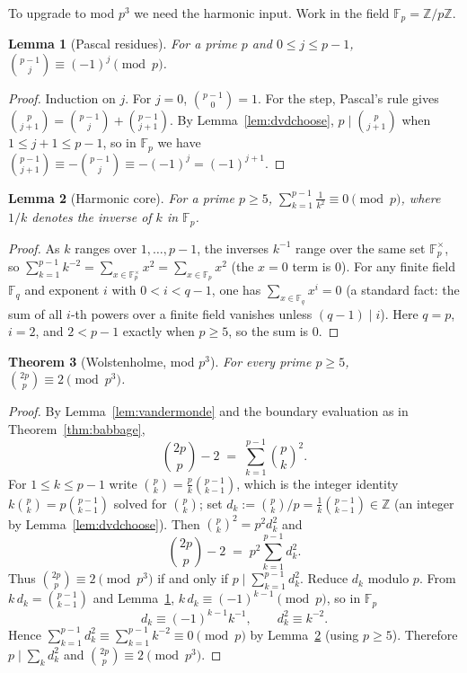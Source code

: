 \documentclass[11pt,a4paper]{article}
\newtheorem{theorem}{Theorem}[section]
\newtheorem{lemma}[theorem]{Lemma}
\theoremstyle{definition}
\theoremstyle{remark}
\begin{document}
To upgrade to mod $p^{3}$ we need the harmonic input.  Work in the field
$\mathbb F_p=\mathbb Z/p\mathbb Z$.

\begin{lemma}[Pascal residues]\label{lem:pascal}
For a prime $p$ and $0\le j\le p-1$, $\binom{p-1}{j}\equiv(-1)^{j}\pmod p$.
\end{lemma}

\begin{proof}
Induction on $j$.  For $j=0$, $\binom{p-1}{0}=1$.  For the step, Pascal's rule
gives $\binom{p}{j+1}=\binom{p-1}{j}+\binom{p-1}{j+1}$.  By
Lemma~\ref{lem:dvdchoose}, $p\mid\binom{p}{j+1}$ when $1\le j+1\le p-1$, so in
$\mathbb F_p$ we have $\binom{p-1}{j+1}\equiv-\binom{p-1}{j}\equiv
-(-1)^{j}=(-1)^{j+1}$.
\end{proof}

\begin{lemma}[Harmonic core]\label{lem:harmonic}
For a prime $p\ge 5$, $\displaystyle\sum_{k=1}^{p-1}\frac{1}{k^{2}}\equiv 0
\pmod p$, where $1/k$ denotes the inverse of $k$ in $\mathbb F_p$.
\end{lemma}

\begin{proof}
As $k$ ranges over $1,\dots,p-1$, the inverses $k^{-1}$ range over the same set
$\mathbb F_p^{\times}$, so $\sum_{k=1}^{p-1}k^{-2}=\sum_{x\in\mathbb
F_p^\times}x^{2}=\sum_{x\in\mathbb F_p}x^{2}$ (the $x=0$ term is $0$).  For any
finite field $\mathbb F_q$ and exponent $i$ with $0<i<q-1$, one has
$\sum_{x\in\mathbb F_q}x^{i}=0$ (a standard fact: the sum of all $i$-th powers
over a finite field vanishes unless $(q-1)\mid i$).  Here $q=p$, $i=2$, and
$2<p-1$ exactly when $p\ge5$, so the sum is $0$.
\end{proof}

\begin{theorem}[Wolstenholme, mod $p^3$]\label{thm:wolstenholme}
For every prime $p\ge 5$, $\binom{2p}{p}\equiv 2\pmod{p^{3}}$.
\end{theorem}

\begin{proof}
By Lemma~\ref{lem:vandermonde} and the boundary evaluation as in
Theorem~\ref{thm:babbage},
\[
  \binom{2p}{p}-2 \;=\; \sum_{k=1}^{p-1}\binom{p}{k}^{2}.
\]
For $1\le k\le p-1$ write $\binom{p}{k}=\tfrac{p}{k}\binom{p-1}{k-1}$, which is
the integer identity $k\binom{p}{k}=p\binom{p-1}{k-1}$ solved for
$\binom{p}{k}$; set $d_k:=\binom{p}{k}/p=\tfrac1k\binom{p-1}{k-1}\in\mathbb Z$
(an integer by Lemma~\ref{lem:dvdchoose}).  Then $\binom{p}{k}^{2}=p^{2}d_k^{2}$
and
\[
  \binom{2p}{p}-2 \;=\; p^{2}\sum_{k=1}^{p-1} d_k^{2}.
\]
Thus $\binom{2p}{p}\equiv 2\pmod{p^{3}}$ if and only if
$p\mid\sum_{k=1}^{p-1}d_k^{2}$.  Reduce $d_k$ modulo $p$.  From
$k\,d_k=\binom{p-1}{k-1}$ and Lemma~\ref{lem:pascal},
$k\,d_k\equiv(-1)^{k-1}\pmod p$, so in $\mathbb F_p$
\[
  d_k\equiv (-1)^{k-1}k^{-1},\qquad
  d_k^{2}\equiv k^{-2}.
\]
Hence $\sum_{k=1}^{p-1}d_k^{2}\equiv\sum_{k=1}^{p-1}k^{-2}\equiv 0\pmod p$ by
Lemma~\ref{lem:harmonic} (using $p\ge5$).  Therefore
$p\mid\sum_k d_k^2$ and $\binom{2p}{p}\equiv 2\pmod{p^3}$.
\end{proof}
\end{document}

